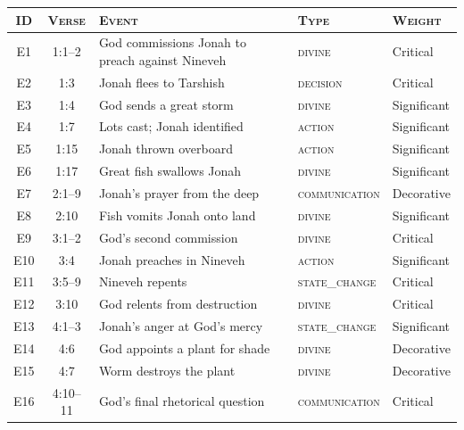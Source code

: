 \documentclass[11pt]{article}
\theoremstyle{rukha}
\newcommand{\sceq}[1]{\textsc{#1}}
\begin{document}
\begin{center}\small
\begin{tabular}{@{}c c p{2.6in} l l@{}}
  \toprule
  \sceq{ID} & \sceq{Verse} & \sceq{Event} & \sceq{Type} & \sceq{Weight} \\
  \midrule
  E1  & 1:1–2  & God commissions Jonah to preach against Nineveh & \textsc{divine}  & Critical \\
  E2  & 1:3    & Jonah flees to Tarshish                         & \textsc{decision}  & Critical \\
  E3  & 1:4    & God sends a great storm                         & \textsc{divine}    & Significant \\
  E4  & 1:7    & Lots cast; Jonah identified                     & \textsc{action}    & Significant \\
  E5  & 1:15   & Jonah thrown overboard                          & \textsc{action}    & Significant \\
  E6  & 1:17   & Great fish swallows Jonah                       & \textsc{divine}    & Significant \\
  E7  & 2:1–9  & Jonah's prayer from the deep                    & \textsc{communication} & Decorative \\
  E8  & 2:10   & Fish vomits Jonah onto land                     & \textsc{divine}    & Significant \\
  \midrule
  E9  & 3:1–2  & God's second commission                         & \textsc{divine}    & Critical \\
  E10 & 3:4    & Jonah preaches in Nineveh                       & \textsc{action}    & Significant \\
  E11 & 3:5–9  & Nineveh repents                                  & \textsc{state\_change} & Critical \\
  E12 & 3:10   & God relents from destruction                    & \textsc{divine}    & Critical \\
  E13 & 4:1–3  & Jonah's anger at God's mercy                    & \textsc{state\_change} & Significant \\
  E14 & 4:6    & God appoints a plant for shade                  & \textsc{divine}    & Decorative \\
  E15 & 4:7    & Worm destroys the plant                         & \textsc{divine}    & Decorative \\
  E16 & 4:10–11 & God's final rhetorical question                & \textsc{communication} & Critical \\
  \bottomrule
\end{tabular}
\end{center}
\end{document}
